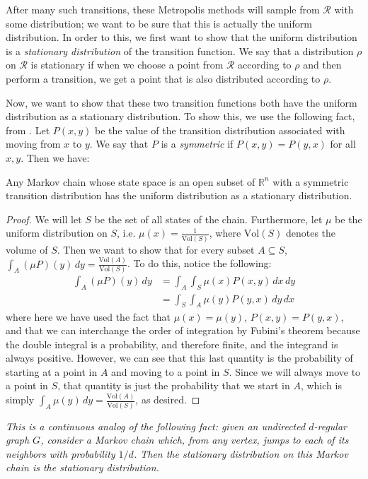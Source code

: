 \documentclass[11pt]{article}
\begin{document}
After many such transitions, these Metropolis methods will sample from $\mathcal{R}$ with some distribution; we want to be sure that this is actually the uniform distribution. In order to this, we first want to show that the uniform distribution is a \emph{stationary distribution} of the transition function. We say that a distribution $\rho$ on $\mathcal{R}$ is stationary if when we choose a point from $\mathcal{R}$ according to $\rho$ and then perform a transition, we get a point that is also distributed according to $\rho$.

Now, we want to show that these two transition functions both have the uniform distribution as a stationary distribution. To show this, we use the following fact, from \cite{Smith}. Let $P(x,y)$ be the value of the transition distribution associated with moving from $x$ to $y$. We say that $P$ is a \emph{symmetric} if $P(x,y) = P(y,x)$ for all $x,y$. Then we have:

\begin{theorem}
Any Markov chain whose state space is an open subset of $\mathbb{R}^n$ with a symmetric transition distribution has the uniform distribution as a stationary distribution.
\label{symmetric}
\end{theorem}
\begin{proof}
We will let $S$ be the set of all states of the chain. Furthermore, let $\mu$ be the uniform distribution on $S$, i.e. $\mu(x) = \frac{1}{\text{Vol}(S)}$, where $\text{Vol}(S)$ denotes the volume of $S$. Then we want to show that for every subset $A \subseteq S$, $\int_A (\mu P)(y)\, dy = \frac{\text{Vol}(A)}{\text{Vol}(S)}$. To do this, notice the following:
\begin{align*}
\int_A (\mu P)(y)\, dy &= \int_A \int_S \mu(x)P(x,y)\, dx\, dy \\
&= \int_S \int_A \mu(y)P(y,x)\, dy\, dx
\end{align*}
where here we have used the fact that $\mu(x) = \mu(y)$, $P(x,y) = P(y,x)$, and that we can interchange the order of integration by Fubini's theorem because the double integral is a probability, and therefore finite, and the integrand is always positive. However, we can see that this last quantity is the probability of starting at a point in $A$ and moving to a point in $S$. Since we will always move to a point in $S$, that quantity is just the probability that we start in $A$, which is simply $\int_A \mu(y)\, dy = \frac{\text{Vol}(A)}{\text{Vol}(S)}$, as desired.
\end{proof}
\begin{remark} 
\emph{This is a continuous analog of the following fact: given an undirected $d$-regular graph $G$, consider a Markov chain which, from any vertex, jumps to each of its neighbors with probability $1/d$. Then the stationary distribution on this Markov chain is the stationary distribution.}
\end{remark}
\end{document}
